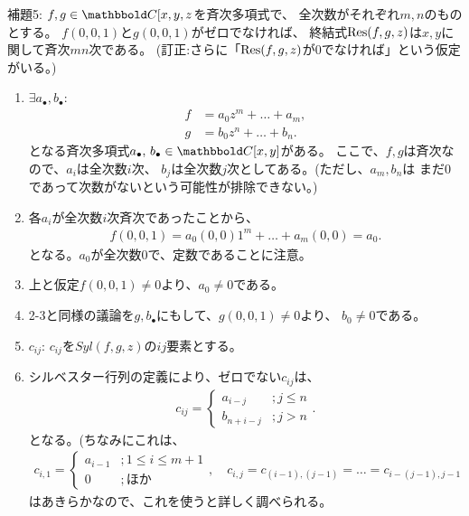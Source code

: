 \begin{framed}
  補題5:
  $f,g \in \C[x,y,z$を斉次多項式で、
  全次数がそれぞれ$m,n$のものとする。
  $f(0,0,1)$と$g(0,0,1)$がゼロでなければ、
  終結式$\mathrm{Res}(f,g,z)$は$x,y$に関して斉次$mn$次である。
  (訂正:さらに「$\mathrm{Res}(f,g,z)$が0でなければ」という仮定がいる。)
\end{framed}
\begin{myproof}
  \begin{enumerate}
    \item $\exists a_\bullet,b_\bullet$:
    \begin{align}
      f&=a_0 z^m + \dots + a_m,\\
      g&= b_0 z^n + \dots + b_n.
    \end{align}
    となる斉次多項式$a_\bullet,\, b_\bullet \in \C[x,y]$がある。
    ここで、$f,g$は斉次なので、$a_i$は全次数$i$次、
    $b_j$は全次数$j$次としてある。(ただし、$a_m,b_n$は
    まだ0であって次数がないという可能性が排除できない。)
    \item
    各$a_i$が全次数$i$次斉次であったことから、
    \begin{align}
      f(0,0,1)
      =
      a_0(0,0)1^m + \dots + a_m(0,0)
      =
      a_0.
    \end{align}
    となる。$a_0$が全次数0で、定数であることに注意。
    \item
    上と仮定$f(0,0,1) \neq 0$より、$a_0 \neq 0$である。
    \item
    2-3と同様の議論を$g,b_\bullet$にもして、$g(0,0,1) \neq 0$より、
    $b_0 \neq 0$である。
    \item $c_{ij}$: $c_{ij}$を$Syl(f,g,z)$の$ij$要素とする。
    \item
    シルベスター行列の定義により、ゼロでない$c_{ij}$は、
    \begin{align}
      c_{ij} =
      \begin{cases}
        a_{i-j} &; j\le n\\
        b_{n+i-j} & ; j>n
      \end{cases}.
    \end{align}
    となる。(ちなみにこれは、
    \begin{align}
      c_{i,1} =
      \begin{cases}
        a_{i-1} & ; 1\le i\le m+1 \\
        0 & ; ほか
      \end{cases},\quad
      c_{i,j} = c_{(i-1),(j-1)} = \dots = c_{i-(j-1),j-1}
    \end{align}
    はあきらかなので、これを使うと詳しく調べられる。

\end{enumerate}
\end{myproof}
